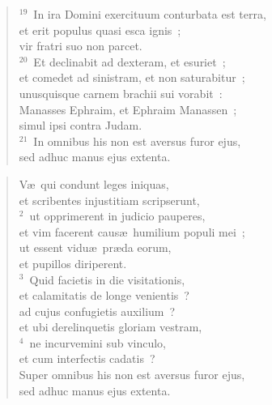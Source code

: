\begin{flushleft}
\begin{verse}
${}^{19}$~In ira Domini exercituum conturbata est terra,\\ et erit populus quasi esca ignis~;\\ vir fratri suo non parcet.\\
${}^{20}$~Et declinabit ad dexteram, et esuriet~;\\ et comedet ad sinistram, et non saturabitur~;\\ unusquisque carnem brachii sui vorabit~:\\ Manasses Ephraim, et Ephraim Manassen~;\\ simul ipsi contra Judam.\\
${}^{21}$~In omnibus his non est aversus furor ejus,\\ sed adhuc manus ejus extenta.\end{verse}\end{flushleft}


\begin{flushleft}\begin{verse}\vspace{-19pt}\hspace{6pt}V\ae\ qui condunt leges iniquas,\\\hspace{6pt} et scribentes injustitiam scripserunt,\\
${}^{2}$~ut opprimerent in judicio pauperes,\\ et vim facerent caus\ae\ humilium populi mei~;\\ ut essent vidu\ae\ pr\ae da eorum,\\ et pupillos diriperent.\\
${}^{3}$~Quid facietis in die visitationis,\\ et calamitatis de longe venientis~?\\ ad cujus confugietis auxilium~?\\ et ubi derelinquetis gloriam vestram,\\
${}^{4}$~ne incurvemini sub vinculo,\\ et cum interfectis cadatis~?\\ Super omnibus his non est aversus furor ejus,\\ sed adhuc manus ejus extenta.\end{verse}\end{flushleft}


